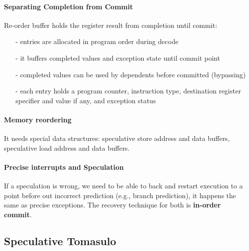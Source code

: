 \paragraph{Separating Completion from Commit} Re-order buffer holds the register result from completion until commit:
\begin{itemize}[noitemsep]
    \item[-] entries are allocated in program order during decode
    \item[-] it buffers completed values and exception state until commit point
    \item[-] completed values can be used by dependents before committed (bypassing)
    \item[-] each entry holds a program counter, instruction type, destination register specifier and value if any,
    and exception status
\end{itemize}

\paragraph{Memory reordering} It needs special data structures:
speculative store address and data buffers, speculative load address and data buffers.

\paragraph{Precise interrupts and Speculation} If a speculation is wrong, we need to be able to back and restart
execution to a point before out incorrect prediction (e.g., branch prediction), it happens the same as precise
exceptions.
The recovery technique for both is \textbf{in-order commit}.


\subsection{Speculative Tomasulo}\label{subsec:speculative-tomasulo}
